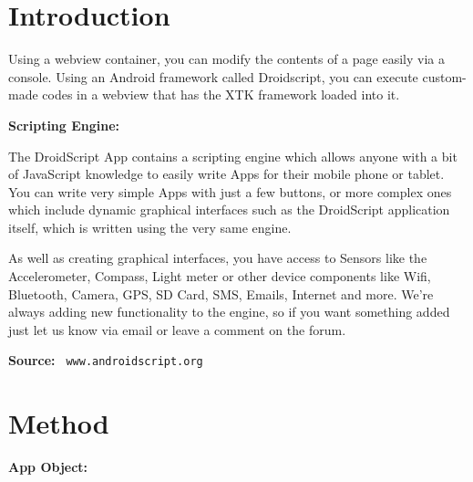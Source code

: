 \documentclass[sigconf]{acmart}
\begin{document}
    \maketitle
    \newpage
    \section{Introduction}
    Using a webview container, you can modify the contents of a page easily via a console. Using an Android framework called Droidscript, you can execute custom-made codes in a webview that has the XTK framework loaded into it.
    
    
    
    \vspace{0.09 cm}
    \textbf{Scripting Engine:}
    
    The DroidScript App contains a scripting engine which allows anyone with a bit of JavaScript knowledge to easily write Apps for their mobile phone or tablet. You can write very simple Apps with just a few buttons, or more complex ones which include dynamic graphical interfaces such as the DroidScript application itself, which is written using the very same engine.
    
    As well as creating graphical interfaces, you have access to Sensors like the Accelerometer, Compass, Light meter or other device components like Wifi, Bluetooth, Camera, GPS, SD Card, SMS, Emails, Internet and more. We're always adding new functionality to the engine, so if you want something added just let us know via email or leave a comment on the forum.
    
    \textbf{Source: } \nolinkurl{ www.androidscript.org}\newline
    \vspace{0.045 cm}
    
    \section{Method}
    
    \textbf{App Object:}
    
\end{document}
